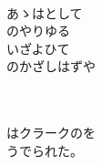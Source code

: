 \documentclass[10pt,b5j]{tarticle} %
\begin{document}
\begin{enumerate}
\begin{minipage}[c]{\blocksize}
        \vspace{\linespace}
        \item~\\
        あゝはとして\\
        のやりゆる\\
        いざよひて\\
        のかざしはずや
        
        
    \end{minipage}
    \begin{minipage}[c]{\blocksize}
        
        \vspace{\linespace}
        \item~\\
        \\
        はクラークのを\\
        うでられた。
    
    \end{minipage}
\end{enumerate} %
\end{document}
